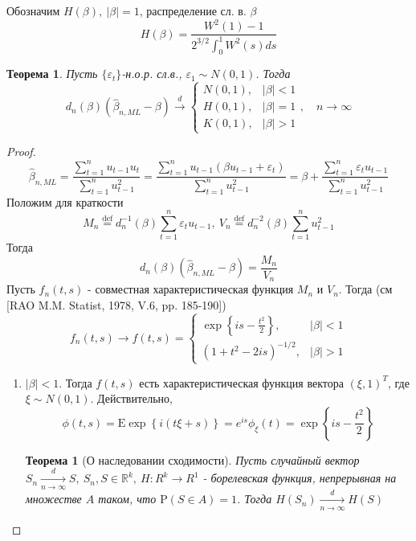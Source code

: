 \documentclass[12pt]{article}
\newtheorem{theorem}{Теорема}
\newtheorem*{theorem*}{Теорема}
\newcommand*{\defeq}{\stackrel{\text{def}}{=}}
\def\eps{ \varepsilon }
\def\R{ \mathbb{R} }
\def\E{ \mathrm{E} }
\def\P{ \mathrm{P} }
\begin{document}
Обозначим $H(\beta),\ \left\lvert \beta\right\rvert =1$, распределение сл. в. $\beta$
\[H(\beta)=\frac{W^2(1)-1}{2^{3/2}\int_0^1W^2(s)ds}\]
\begin{theorem}
    Пусть $\{\eps_t\}$-н.о.р. сл.в., $\eps_1\sim N(0,1)$. Тогда
    \[d_n(\beta)(\widehat{\beta}_{n,ML}-\beta)\xrightarrow{d}\begin{cases}
        N(0,1),& \left\lvert \beta\right\rvert <1 \\
        H(0,1),& \left\lvert \beta\right\rvert =1 \\
        K(0,1),& \left\lvert \beta\right\rvert >1 
    \end{cases}, \quad n\rightarrow\infty\]
\end{theorem}
\begin{proof}
    \[\widehat{\beta}_{n,ML}=\frac{\sum_{t=1}^nu_{t-1}u_t}{\sum_{t=1}^nu_{t-1}^2}=\frac{\sum_{t=1}^nu_{t-1}(\beta u_{t-1}+\eps_t)}{\sum_{t=1}^nu_{t-1}^2}=\beta+\frac{\sum_{t=1}^n\eps_tu_{t-1}}{\sum_{t=1}^nu_{t-1}^2}\]
    Положим для краткости
    \[M_n\defeq d^{-1}_n(\beta)\sum_{t=1}^n\eps_tu_{t-1},\ V_n\defeq d^{-2}_n(\beta)\sum_{t=1}^nu^2_{t-1}\]
    Тогда 
    \[d_n(\beta)(\widehat{\beta}_{n,ML}-\beta)=\frac{M_n}{V_n}\]
    Пусть $f_n(t,s)$ - совместная характеристическая функция $M_n$ и $V_n$.
    Тогда (см [RAO M.M. Statist, 1978, V.6, pp. 185-190])
    \begin{equation}\label{def::mutual_char_func}
        f_n(t,s)\rightarrow f(t,s)=\begin{cases}
            \exp{\left\{is-\frac{t^2}{2}\right\}},& \left\lvert \beta\right\rvert <1 \\
            (1+t^2-2is)^{-1/2},& \left\lvert \beta\right\rvert >1
        \end{cases}
    \end{equation}
    \begin{enumerate}
        \item \underline{$\left\lvert \beta\right\rvert <1$}. Тогда $f(t,s)$ есть характеристическая
        функция вектора $(\xi,1)^T$, где $\xi\sim N(0,1)$. Действительно,
        \[\phi(t,s)=\E\exp{\left\{i(t\xi+s)\right\}}=e^{is}\phi_\xi(t)=\exp{\left\{is-\frac{t^2}{2}\right\}}\]
        \begin{theorem*}[О наследовании сходимости]
            Пусть случайный вектор $S_n\underset{n\rightarrow\infty}{\xrightarrow{d}}S,\ S_n,S\in\R^k,\ H:R^k\rightarrow R^1$ - 
            борелевская функция, непрерывная на множестве $A$ таком, что $\P(S\in A)=1$. Тогда $H(S_n)\underset{n\rightarrow\infty}{\xrightarrow{d}}H(S)$

\end{theorem*}
\end{enumerate}
\end{proof}
\end{document}
